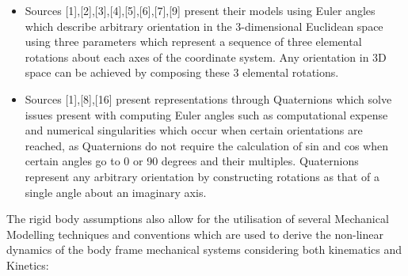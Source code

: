 \documentclass[12pt,a4paper,twoside]{report}
\begin{document}
				\begin{itemize}
					\item 
						Sources [1],[2],[3],[4],[5],[6],[7],[9] present their models using Euler angles which describe arbitrary orientation in the 3-dimensional Euclidean space using three parameters which represent a sequence of three elemental rotations about each axes of the coordinate system. Any orientation in 3D space can be achieved by composing these 3 elemental rotations.
					\item
						Sources [1],[8],[16] present representations through Quaternions which solve issues present with computing Euler angles such as computational expense and numerical singularities which occur when certain orientations are reached, as Quaternions do not require the calculation of sin and cos when certain angles go to 0 or 90 degrees and their multiples. Quaternions represent any arbitrary orientation by constructing rotations as that of a single angle about an imaginary axis. 
				\end{itemize}
				\space
				The rigid body assumptions also allow for the utilisation of several Mechanical Modelling techniques and conventions which are used to derive the non-linear dynamics of the body frame mechanical systems considering both kinematics and Kinetics:
				
\end{document}
